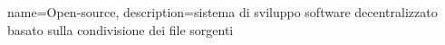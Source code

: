 {
	name={Open-source},
	description={sistema di sviluppo software decentralizzato basato sulla condivisione dei file sorgenti}
}